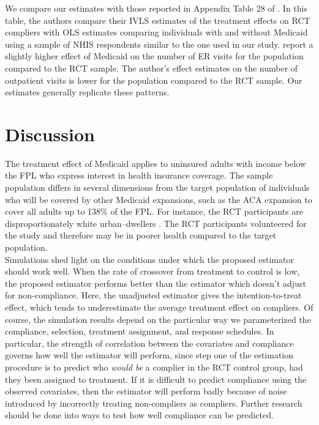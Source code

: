 \documentclass[12pt]{article}
\begin{document}
We compare our estimates with those reported in Appendix Table 28 of \citet{finkelstein2012}. In this table, the authors compare their IVLS estimates of the treatment effects on RCT compliers with OLS estimates comparing individuals with and without Medicaid using a sample of NHIS respondents similar to the one used in our study. \citet{finkelstein2012} report a slightly higher effect of Medicaid on the number of ER visits for the population compared to the RCT sample. The author's effect estimates on the number of outpatient visits is lower for the population compared to the RCT sample. Our estimates generally replicate these patterns. 


\section{Discussion}

The treatment effect of Medicaid applies to uninsured adults with income below the FPL who express interest in health insurance coverage. The sample population differs in several dimensions from the target population of individuals who will be covered by other Medicaid expansions, such as the ACA expansion to cover all adults up to 138\% of the FPL. For instance, the RCT participants are disproportionately white urban--dwellers \citep{Taubman}. The RCT participants volunteered for the study and therefore may be in poorer health compared to the target population. \\

Simulations shed light on the conditions under which the proposed estimator should work well.  When the rate of crossover from treatment to control is low, the proposed estimator performs better than the estimator which doesn't adjust for non-compliance.  Here, the unadjusted estimator gives the intention-to-treat effect, which tends to underestimate the average treatment effect on compliers. Of course, the simulation results depend on the particular way we parameterized the compliance, selection, treatment assignment, and response schedules.  In particular, the strength of correlation between the covariates and compliance governs how well the estimator will perform, since step one of the estimation procedure is to predict who \textit{would be} a complier in the RCT control group, had they been assigned to treatment. If it is difficult to predict compliance using the observed covariates, then the estimator will perform badly because of noise introduced by incorrectly treating non-compliers as compliers.  Further research should be done into ways to test how well compliance can be predicted. \\
\end{document}
